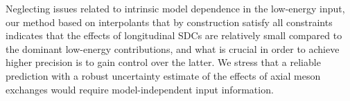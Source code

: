 Neglecting issues related to intrinsic model dependence in the low-energy input, our method based on interpolants that by construction satisfy all constraints indicates that the effects of longitudinal SDCs are relatively small compared to the dominant low-energy contributions, and what is crucial in order to achieve higher precision is to gain control over the latter. We stress that a reliable prediction with a robust uncertainty estimate of the effects of axial meson exchanges would require model-independent input information.